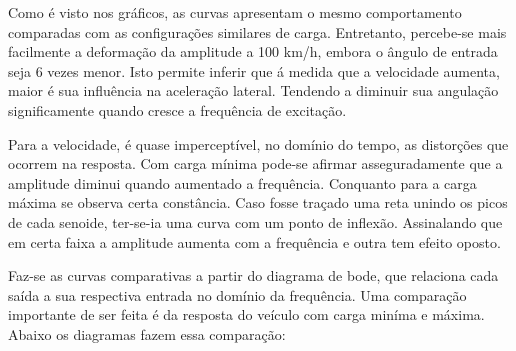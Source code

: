 \documentclass[a4paper, 12pt]{article}
\begin{document}
Como é visto nos gráficos, as curvas apresentam o mesmo comportamento comparadas com as configurações similares de carga. Entretanto, percebe-se mais facilmente a deformação da amplitude a 100 km/h, embora o ângulo de entrada seja 6 vezes menor. Isto permite inferir que á medida que a velocidade aumenta, maior é sua influência na aceleração lateral. Tendendo a diminuir sua angulação significamente quando cresce a frequência de excitação.

Para a velocidade, é quase imperceptível, no domínio do tempo, as distorções que ocorrem na resposta. Com carga mínima pode-se afirmar asseguradamente que a amplitude diminui quando aumentado a frequência. Conquanto para a carga máxima se observa certa constância. Caso fosse traçado uma reta unindo os picos de cada senoide, ter-se-ia uma curva com um ponto de inflexão. Assinalando que em certa faixa a amplitude aumenta com a frequência e outra tem efeito oposto.

Faz-se as curvas comparativas a partir do diagrama de bode, que relaciona cada saída a sua respectiva entrada no domínio da frequência.
Uma comparação importante de ser feita é da resposta do veículo com carga miníma e máxima. Abaixo os diagramas fazem essa comparação:
\end{document}
